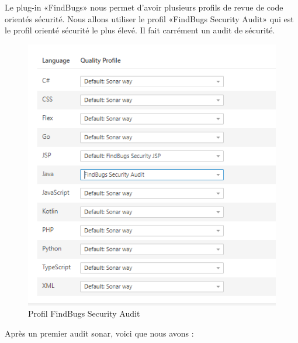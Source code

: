 Le plug-in «FindBugs» nous permet d'avoir plusieurs profils de revue de code orientés sécurité. Nous allons utiliser le profil «FindBugs Security Audit» qui est le profil orienté sécurité le plus élevé. Il fait carrément un audit de sécurité.
\begin{figure}[H]
	\centering
	\begin{minipage}{12cm}
		\centering
		\includegraphics[width=1\textwidth]{fig/findbugs-profile.png}
	\end{minipage}
	\caption{Profil FindBugs Security Audit}
	\label{fig:sdfds}
\end{figure}
Après un premier audit sonar, voici que nous avons :
